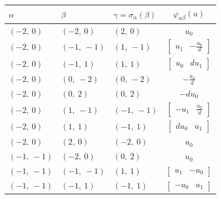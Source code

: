 \documentclass[11pt]{article}
\newcommand{\noi}{\noindent}
\theoremstyle{definition}
\begin{document}
\noi \noindent \begin{longtable}{|l|l|l|c|}
    \hline
    \textbf{$\alpha$} & \textbf{$\beta$} & \textbf{$\gamma = \sigma_{\alpha}(\beta)$} & $\varphi_{\alpha\beta}(u)$ \\
    \hline
    \endhead
    $\left( -2, \  0\right)$ & $\left( -2, \  0\right)$ & $\left( 2, \  0\right)$ & $u_{0}$ \\
    \hline
    $\left( -2, \  0\right)$ & $\left( -1, \  -1\right)$ & $\left( 1, \  -1\right)$ & $\left[\begin{matrix}u_{1} & - \frac{u_{0}}{d}\end{matrix}\right]$ \\
    \hline
    $\left( -2, \  0\right)$ & $\left( -1, \  1\right)$ & $\left( 1, \  1\right)$ & $\left[\begin{matrix}u_{0} & d u_{1}\end{matrix}\right]$ \\
    \hline
    $\left( -2, \  0\right)$ & $\left( 0, \  -2\right)$ & $\left( 0, \  -2\right)$ & $- \frac{u_{0}}{d}$ \\
    \hline
    $\left( -2, \  0\right)$ & $\left( 0, \  2\right)$ & $\left( 0, \  2\right)$ & $- d u_{0}$ \\
    \hline
    $\left( -2, \  0\right)$ & $\left( 1, \  -1\right)$ & $\left( -1, \  -1\right)$ & $\left[\begin{matrix}- u_{1} & \frac{u_{0}}{d}\end{matrix}\right]$ \\
    \hline
    $\left( -2, \  0\right)$ & $\left( 1, \  1\right)$ & $\left( -1, \  1\right)$ & $\left[\begin{matrix}d u_{0} & u_{1}\end{matrix}\right]$ \\
    \hline
    $\left( -2, \  0\right)$ & $\left( 2, \  0\right)$ & $\left( -2, \  0\right)$ & $u_{0}$ \\
    \hline
    $\left( -1, \  -1\right)$ & $\left( -2, \  0\right)$ & $\left( 0, \  2\right)$ & $u_{0}$ \\
    \hline
    $\left( -1, \  -1\right)$ & $\left( -1, \  -1\right)$ & $\left( 1, \  1\right)$ & $\left[\begin{matrix}u_{1} & - u_{0}\end{matrix}\right]$ \\
    \hline
    $\left( -1, \  -1\right)$ & $\left( -1, \  1\right)$ & $\left( -1, \  1\right)$ & $\left[\begin{matrix}- u_{0} & u_{1}\end{matrix}\right]$ \\

\end{longtable}
\end{document}

